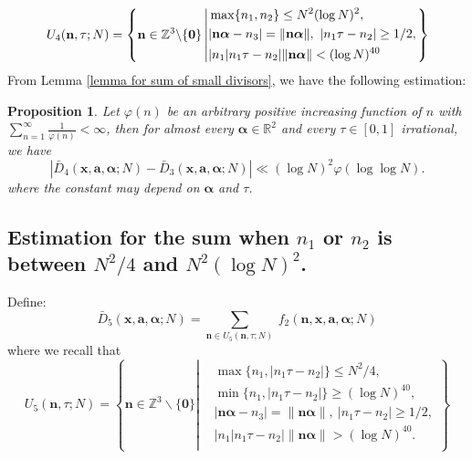 \documentclass[11pt]{article}
\newtheorem{Prop}{Proposition}[section]
\newcommand{\beq}{\begin{equation}}
\newcommand{\eeq}{\end{equation}}
\newcommand{\fc}{\frac}
\renewcommand{\l}{\left}
\renewcommand{\r}{\right}
\newcommand{\Z}{\mathbb{Z}}
\newcommand{\R}{\mathbb{R}}
\renewcommand{\a}{\alpha}
\newcommand{\e}{\epsilon}
\renewcommand{\(}{\left(}
\renewcommand{\)}{\right)}
\renewcommand{\bf}{\mathbf}
\newcommand{\bal}{\begin{aligned}}
\newcommand{\eal}{\end{aligned}}
\newcommand{\n}{\bf{n}}
\newcommand{\bma}{\bm{\alpha}}
\newcommand{\ftwo}{f_2(\bf{n},\bf{x},\bm{a},\bm{\a};N)}
\newcommand{\<}{\langle}
\renewcommand{\>}{\rangle}
\begin{document}

\beq{\label{condition for small divisors}}
U_4(\n,\tau;N)=\l\{\n \in \Z^3\backslash \{\bf{0}\} \l| 
\bal &\max\{n_1,n_2\} \le N^2(\log N)^2, \\
& |\n\bma-n_3|=\|\n\bma \|,\ |n_1\tau-n_2|\ge 1/2,\\
& |n_1|n_1\tau-n_2|\|\bf{n}\bma\|< (\log N)^{40} \\
\eal\r.
\r\}
\eeq 
From Lemma \ref{lemma for sum of small divisors}, we have the following estimation: 
\begin{Prop}\label{control for sum of small divisors}
Let $\varphi(n)$ be an arbitrary positive increasing function of $n$ with $\sum_{n=1}^{\infty} \fc{1}{\varphi(n)}< \infty$, then for almost every $\bma\in\R^2$ and every $\tau\in [0,1]$ irrational, we have
$$
\l|\bar{D}_4(\bf{x},\bm{a},\bm{\a};N)-\bar{D}_3(\bf{x},\bm{a},\bm{\a};N) \r|\ll (\log N)^2\varphi(\log \log N).
$$
where the constant may depend on $\bma$ and $\tau$.
\end{Prop}



\subsection{Estimation for the sum when $n_1$ or $n_2$ is between $N^2/4$ and $N^2(\log N)^2$.}
Define:
$$
\bar{D}_5(\bf{x},\bm{a},\bm{\a};N)=\sum_{\n\in U_5(\n,\tau;N)}  \ \ftwo
$$
where we recall that 
$$
U_5(\n,\tau;N)=\l\{\n \in \Z^3\backslash \{\bf{0}\} \l| 
\bal &\max\{n_1,|n_1\tau-n_2|\} \le N^2/4, \\
&\min\{n_1,|n_1\tau-n_2|\}\ge(\log N)^{40}, \\
& |\n\bma-n_3|=\|\n\bma \|,\ |n_1\tau-n_2|\ge 1/2,\\
& |n_1|n_1\tau-n_2|\|\bf{n}\bma\|>(\log N)^{40}. \\
\eal\r.
\r\}
$$
\end{document}
